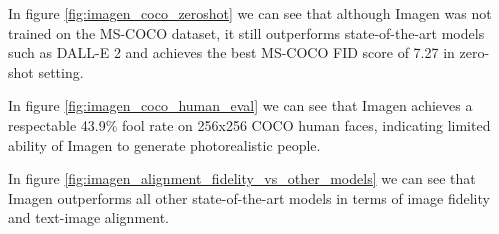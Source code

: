 In figure \ref{fig:imagen_coco_zeroshot} we can see that although Imagen was not trained on the MS-COCO dataset, it still outperforms state-of-the-art models such as DALL-E 2 \cite{dalle_2} and achieves the best MS-COCO FID score of 7.27 in zero-shot setting.

In figure \ref{fig:imagen_coco_human_eval} we can see that Imagen achieves a respectable 43.9\% fool rate on 256x256 COCO human faces, indicating limited ability of Imagen to generate photorealistic people.

In figure \ref{fig:imagen_alignment_fidelity_vs_other_models} we can see that Imagen outperforms all other state-of-the-art models in terms of image fidelity and text-image alignment.
